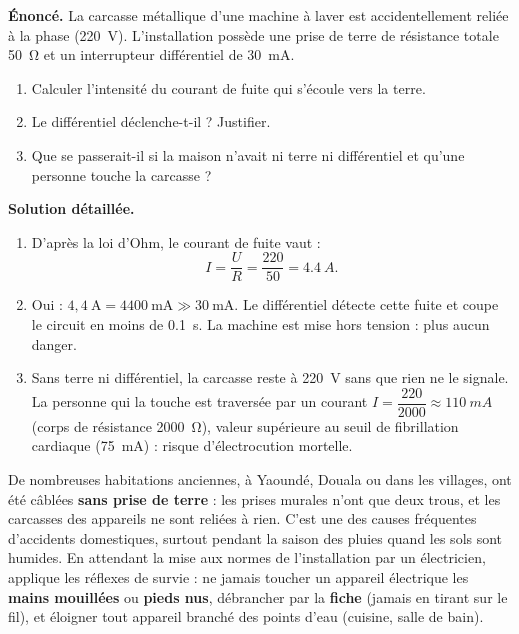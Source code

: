 \documentclass[11pt]{article}
\begin{document}
\begin{exoresolu}
\textbf{Énoncé.} La carcasse métallique d'une machine à laver est accidentellement reliée à la phase (\SI{220}{V}). L'installation possède une prise de terre de résistance totale \SI{50}{\ohm} et un interrupteur différentiel de \SI{30}{mA}.
\begin{enumerate}
\item Calculer l'intensité du courant de fuite qui s'écoule vers la terre.
\item Le différentiel déclenche-t-il ? Justifier.
\item Que se passerait-il si la maison n'avait ni terre ni différentiel et qu'une personne touche la carcasse ?
\end{enumerate}
\tcblower
\textbf{Solution détaillée.}
\begin{enumerate}
\item D'après la loi d'Ohm, le courant de fuite vaut :
\[ I = \frac{U}{R} = \frac{220}{50} = \SI{4,4}{A}. \]
\item Oui : $4{,}4\ \text{A} = 4400\ \text{mA} \gg 30\ \text{mA}$. Le différentiel détecte cette fuite et coupe le circuit en moins de \SI{0,1}{s}. La machine est mise hors tension : plus aucun danger.
\item Sans terre ni différentiel, la carcasse reste à \SI{220}{V} sans que rien ne le signale. La personne qui la touche est traversée par un courant $I = \dfrac{220}{2000} \approx \SI{110}{mA}$ (corps de résistance \SI{2000}{\ohm}), valeur supérieure au seuil de fibrillation cardiaque (\SI{75}{mA}) : risque d'électrocution mortelle.
\end{enumerate}
\end{exoresolu}

\begin{savaistu}
De nombreuses habitations anciennes, à Yaoundé, Douala ou dans les villages, ont été câblées \textbf{sans prise de terre} : les prises murales n'ont que deux trous, et les carcasses des appareils ne sont reliées à rien. C'est une des causes fréquentes d'accidents domestiques, surtout pendant la saison des pluies quand les sols sont humides. En attendant la mise aux normes de l'installation par un électricien, applique les réflexes de survie : ne jamais toucher un appareil électrique les \textbf{mains mouillées} ou \textbf{pieds nus}, débrancher par la \textbf{fiche} (jamais en tirant sur le fil), et éloigner tout appareil branché des points d'eau (cuisine, salle de bain).
\end{savaistu}
\end{document}
